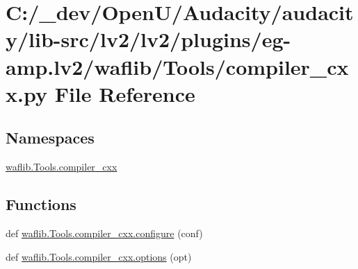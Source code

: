 \hypertarget{lv2_2plugins_2eg-amp_8lv2_2waflib_2_tools_2compiler__cxx_8py}{}\section{C\+:/\+\_\+dev/\+Open\+U/\+Audacity/audacity/lib-\/src/lv2/lv2/plugins/eg-\/amp.lv2/waflib/\+Tools/compiler\+\_\+cxx.py File Reference}
\label{lv2_2plugins_2eg-amp_8lv2_2waflib_2_tools_2compiler__cxx_8py}
\subsection*{Namespaces}
\begin{DoxyCompactItemize}
\item 
 \hyperlink{namespacewaflib_1_1_tools_1_1compiler__cxx}{waflib.\+Tools.\+compiler\+\_\+cxx}
\end{DoxyCompactItemize}
\subsection*{Functions}
\begin{DoxyCompactItemize}
\item 
def \hyperlink{namespacewaflib_1_1_tools_1_1compiler__cxx_a0788b7c415a9fd34ea0f3f575fe60db3}{waflib.\+Tools.\+compiler\+\_\+cxx.\+configure} (conf)
\item 
def \hyperlink{namespacewaflib_1_1_tools_1_1compiler__cxx_a26997eea0edf25e3990533d4011a38e5}{waflib.\+Tools.\+compiler\+\_\+cxx.\+options} (opt)
\end{DoxyCompactItemize}
